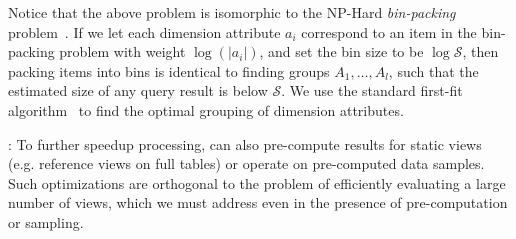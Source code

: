 Notice that the above problem is isomorphic to the NP-Hard {\em bin-packing} problem~\cite{garey}.
If we let each dimension attribute
$a_i$ correspond to an item in the bin-packing problem with weight $\log (|a_i|)$,
and set the bin size to be $\log \mathcal{S}$,
then packing items into bins is identical to finding groups $A_1, \ldots, A_l$,
such that the estimated size of any query result is below $\mathcal{S}$.
We use the standard first-fit algorithm~\cite{first-fit} to find the optimal
grouping of dimension attributes.

: 
To further speedup processing, \SeeDB can also pre-compute results for 
static views (e.g. reference views on full tables) or operate on
pre-computed data samples.  Such optimizations are orthogonal to the
problem of efficiently evaluating a large number of views, which we must address
even in the presence of pre-computation or sampling.